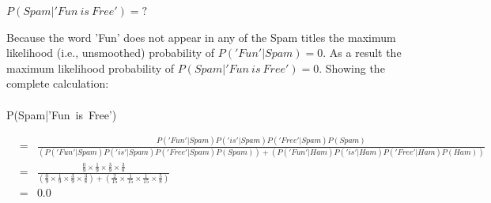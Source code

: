 \documentclass[--SOLUTION-OPTION--]{ditpaper}
\begin{document}
\begin{enumerate}
					\begin{center}
				$P(Spam|'Fun~is~Free')=?$
			\end{center}
			\begin{answer}
				Because the word 'Fun' does not appear in any of the Spam titles the maximum likelihood (i.e., unsmoothed) probability of $P('Fun'|Spam)=0$. As a result the maximum likelihood probability of $P(Spam|'Fun~is~Free')=0$. Showing the complete calculation: \\
				\\
				P(Spam|'Fun~is~Free')
				\begin{scriptsize}
				\begin{eqnarray*}
					&=& \frac{P('Fun'|Spam)P('is'|Spam)P('Free'|Spam)P(Spam)}{(P('Fun'|Spam)P('is'|Spam)P('Free'|Spam)P(Spam))+(P('Fun'|Ham)P('is'|Ham)P('Free'|Ham)P(Ham))}\\
					&=& \frac{\frac{0}{9} \times \frac{1}{9} \times \frac{3}{9} \times \frac{3}{8}}{(\frac{0}{9} \times \frac{1}{9} \times \frac{3}{9} \times \frac{3}{8})+(\frac{2}{15} \times \frac{1}{15} \times \frac{1}{15} \times \frac{5}{8})}\\
					&=& 0.0
				\end{eqnarray*}
				\end{scriptsize}
			\end{answer}
	\end{enumerate}
%
\newpage

\end{document}
